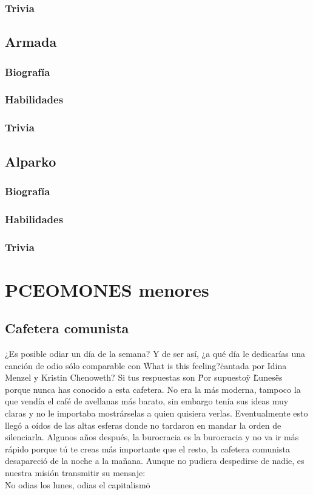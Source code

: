 \documentclass[letterpaper]{article}
\begin{document}
\subsubsection{Trivia}

\subsection{Armada}

\subsubsection{Biografía}

\subsubsection{Habilidades}

\subsubsection{Trivia}

\subsection{Alparko}

\subsubsection{Biografía}

\subsubsection{Habilidades}

\subsubsection{Trivia}
\section{PCEOMONES menores}
\subsection{Cafetera comunista}
¿Es posible odiar un día de la semana? Y de ser así, ¿a qué día le dedicarías una canción de odio sólo comparable con \"What is this feeling?\" cantada por Idina
Menzel y Kristin Chenoweth? Si tus respuestas son \"Por supuesto\" y \"Lunes\" es porque nunca has conocido a esta cafetera. No era la más moderna, tampoco la que
vendía el café de avellanas más barato, sin embargo tenía sus ideas muy claras y no le importaba mostrárselas a quien quisiera verlas. Eventualmente esto llegó a 
oídos de las altas esferas donde no tardaron en mandar la orden de silenciarla. Algunos años después, la burocracia es la burocracia y no va ir más rápido porque tú 
te creas más importante que el resto, la cafetera comunista desapareció de la noche a la mañana. Aunque no pudiera despedirse de nadie, es nuestra misión transmitir su mensaje:\\
 \"No odias los lunes, odias el capitalismo\"
\end{document}
